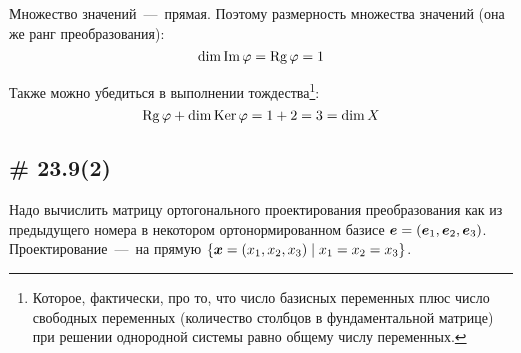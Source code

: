 \documentclass[a4paper,12pt]{article}
\DeclareMathOperator{\Image}{Im}
\begin{document}
\begin{solution}
  Множество значений~---~прямая.
  Поэтому размерность множества значений (она же ранг преобразования):
  \[
    \dim\Image\phi = \Rg\phi = 1
  \]
  
  Также можно убедиться в выполнении тождества\footnote{Которое, фактически, про то, что число базисных переменных плюс число свободных переменных (количество столбцов в фундаментальной матрице) при решении однородной системы равно общему числу переменных.}:
  \[
    \operatorname{Rg}\varphi + \dim\operatorname{Ker}\varphi = 1 + 2 = 3 = \dim X
  \]
  \end{solution}
  
  
  \subsection{\# 23.9(2)}
  
  Надо вычислить матрицу ортогонального проектирования преобразования как из предыдущего номера в некотором ортонормированном базисе $\bds e \hm= (\bds e_1, \bds e_2, \bds e_3)$.
  Проектирование~---~на прямую $\{\bds x = (x_1, x_2, x_3) \mid x_1 \hm= x_2 \hm= x_3\}$.
  
\end{document}
